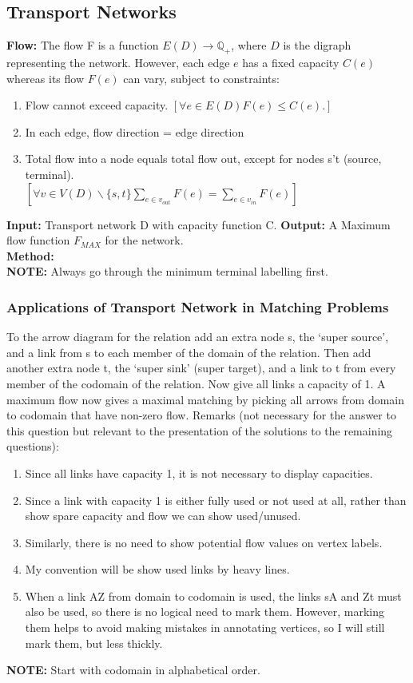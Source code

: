\documentclass{article}
\begin{document}
\begin{spacing}{1.5}
\subsection{Transport Networks}
\textbf{Flow:} The flow F is a function $E(D) \rightarrow \mathbb{Q}_+$, where $D$ is the digraph representing the network. However, each edge $e$ has a fixed capacity $C(e)$ whereas its flow $F(e)$ can vary, subject to constraints:
\begin{enumerate}
    \item Flow cannot exceed capacity. $[\forall e \in E(D) F(e) \le C(e).]$
    \item In each edge, flow direction = edge direction 
    \item Total flow into a node equals total flow out, except for nodes s’t (source, terminal).\\ 
    $[\forall v \in V(D) \backslash \{s,t\} \sum_{e\in v_{out}}F(e)=\sum_{e\in v_{in}}F(e)]$
\end{enumerate} 
\textbf{Input:} Transport network D with capacity function C.
\textbf{Output:} A Maximum flow function $F_{MAX}$ for the network.\\  
\textbf{Method:} \\
\textbf{NOTE:} Always go through the minimum terminal labelling first. 
\subsubsection{Applications of Transport Network in Matching Problems }
To the arrow diagram for the relation add an extra node s, the ‘super source’, and a link from s to each member of the domain of the relation. Then add another extra node t, the ‘super sink’ (super target), and a link to t from every member of the codomain of the relation. Now give all links a capacity of 1. A maximum flow now gives a maximal matching by picking all arrows from domain to codomain that have non-zero flow.
Remarks (not necessary for the answer to this question but relevant to the presentation of the solutions to the remaining questions):
\begin{enumerate}
    \item Since all links have capacity 1, it is not necessary to display capacities.
    \item Since a link with capacity 1 is either fully used or not used at all, rather than show
    spare capacity and flow we can show used/unused.
    \item Similarly, there is no need to show potential flow values on vertex labels.
    \item My convention will be show used links by heavy lines.
    \item When a link AZ from domain to codomain is used, the links sA and Zt must also be used, so there is no logical need to mark them. However, marking them helps to avoid making mistakes in annotating vertices, so I will still mark them, but less thickly.
\end{enumerate}
\textbf{NOTE:}
Start with codomain in alphabetical order. 


\end{spacing}
\end{document}
